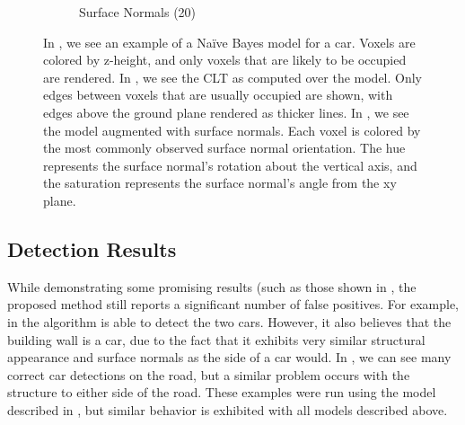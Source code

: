\begin{figure}
\begin{subfigure}[]{0.3\linewidth}
    \caption{Surface Normals (\unit{20}{\cm})}
    \label{fig:sn}
  \end{subfigure}
  \caption{In , we see an example of a Na\"ive Bayes model for a
    car. Voxels are colored by z-height, and only voxels that are likely to be
    occupied are rendered. In , we see the \ac{CLT} as computed
    over the model. Only edges between voxels that are usually occupied are
    shown, with edges above the ground plane rendered as thicker lines. In
    , we see the model augmented with surface normals. Each voxel
    is colored by the most commonly observed surface normal orientation. The hue
    represents the surface normal's rotation about the vertical axis, and the
    saturation represents the surface normal's angle from the xy plane.}
  \label{fig:models}
\end{figure}

\subsection{Detection Results}

While demonstrating some promising results (such as those shown in
, the proposed method still reports a significant number
of false positives. For example, in  the algorithm is able to
detect the two cars. However, it also believes that the building wall is a car,
due to the fact that it exhibits very similar structural appearance and surface
normals as the side of a car would. In , we can see many correct
car detections on the road, but a similar problem occurs with the structure to
either side of the road. These examples were run using the model described in
, but similar behavior is exhibited with all models
described above.

